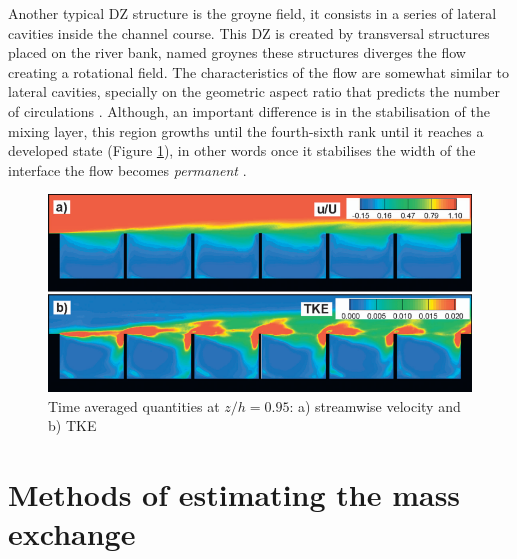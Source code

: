 \documentclass[../main.tex]{subfiles}
\begin{document}
Another typical DZ structure is the groyne field, it consists in a series of lateral cavities inside the channel course. This DZ is created by transversal structures placed on the river bank, named groynes these structures diverges the flow creating a rotational field. The characteristics of the flow are somewhat similar to lateral cavities, specially on the geometric aspect ratio that predicts the number of circulations \cite{weitbrecht2004,uijttewaal2005,xiang2020}. Although, an important difference is in the stabilisation of the mixing layer, this region growths until the fourth-sixth rank until it reaches a developed state (Figure \ref{fig:groyneStabilisation}), in other words once it stabilises the width of the interface the flow becomes \textit{permanent} \cite{weitbrecht2004, mcCoy2008, xiang2020}.

\begin{figure}[!ht]
\centering
\includegraphics[width=0.9\linewidth]{../images/introduction/groyneStabilisation.png}
\caption{Time averaged quantities at $z/h=0.95$: a) streamwise velocity and b) TKE \cite{mcCoy2008}}
\label{fig:groyneStabilisation}
\end{figure}

\section{Methods of estimating the mass exchange }
\end{document}
